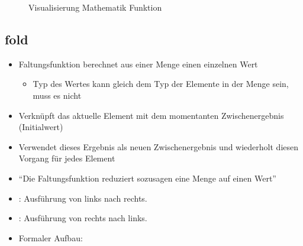 \documentclass{../tuda-beamer}
\begin{document}
  \begin{frame}
    \begin{figure}[h]
      \centering
      \caption{Visualisierung Mathematik Funktion}
    \end{figure}
  \end{frame}

  \subsection{fold}
  \begin{frame}{}
    \begin{itemize}
      \item Faltungsfunktion berechnet aus einer Menge einen einzelnen Wert
      \begin{itemize}
        \item Typ des Wertes kann gleich dem Typ der Elemente in der Menge sein, muss es nicht
      \end{itemize}
      \item Verknüpft das aktuelle Element mit dem momentanten Zwischenergebnis (Initialwert)
      \item Verwendet dieses Ergebnis als neuen Zwischenergebnis und wiederholt diesen Vorgang
      für jedes Element
      \item \enquote{Die Faltungsfunktion reduziert sozusagen eine Menge auf einen Wert}
      \item {}: Ausführung von links nach rechts.
      \item {}: Ausführung von rechts nach links.
      \item Formaler Aufbau:
      \begin{center}

      \end{center}
    \end{itemize}
  \end{frame}
\end{document}
